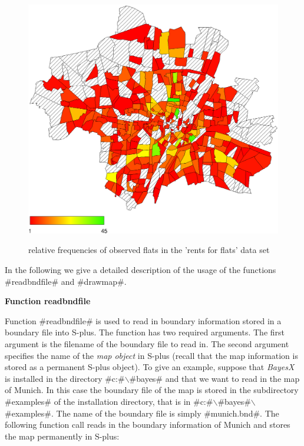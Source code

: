 \begin{figure}[ht]
\begin{center}
\includegraphics[scale=0.5]{grafiken/munichfr.eps}
{\em\caption{ \label{munichrelfreq} relative frequencies of
observed flats in the 'rents for flats' data set}}
\end{center}
\end{figure}


In the following we give a detailed description of the usage of
the functions #readbndfile# and #drawmap#.

{\bf Function readbndfile}
\medskip
{} 

Function #readbndfile# is used to read in boundary information
stored in a boundary file into S-plus. The function has two
required arguments. The first argument is the filename of the
boundary file to read in. The second argument specifies the name
of the {\em map object} in S-plus (recall that the map information
is stored as a permanent S-plus object). To give an example,
suppose that {\em BayesX} is installed in the directory
#c:#$\backslash$#bayes# and that we want to read in the map of
Munich. In this case the boundary file of the map is stored in the
subdirectory #examples# of the installation directory, that is in
#c:#$\backslash$#bayes#$\backslash$#examples#. The name of the
boundary file is simply #munich.bnd#. The following function call
reads in the boundary information of Munich and stores the map
permanently in S-plus:

